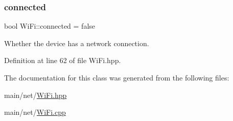 \subsubsection{\texorpdfstring{connected}{connected}}
{\footnotesize\ttfamily bool Wi\+Fi\+::connected = false}

Whether the device has a network connection. 

Definition at line 62 of file Wi\+Fi.\+hpp.



The documentation for this class was generated from the following files\+:\begin{DoxyCompactItemize}
\item 
main/net/\mbox{\hyperlink{WiFi_8hpp}{Wi\+Fi.\+hpp}}\item 
main/net/\mbox{\hyperlink{WiFi_8cpp}{Wi\+Fi.\+cpp}}\end{DoxyCompactItemize}
